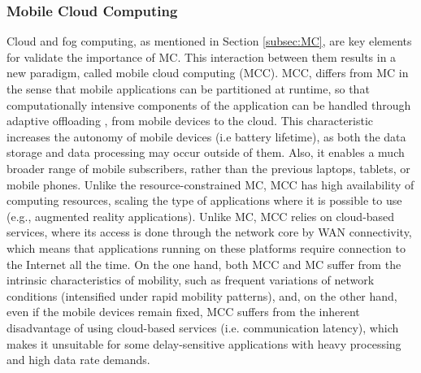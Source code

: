 \subsubsection{Mobile Cloud Computing}
\noindent Cloud and fog computing, as mentioned in Section \ref{subsec:MC}, are key elements for validate the importance of MC. This interaction between them results in a new paradigm, called mobile cloud computing (MCC). MCC, differs from MC in the sense that mobile applications can be partitioned at runtime, so that computationally intensive components of the application can be handled through adaptive offloading \cite{shiraz2013review}, from mobile devices to the cloud. This characteristic increases the autonomy of mobile devices (i.e battery lifetime), as both the data storage and data processing may occur outside of them. Also, it enables a much broader range of mobile subscribers, rather than the previous laptops, tablets, or mobile phones. Unlike the resource-constrained MC, MCC has high availability of computing resources, scaling the type of applications where it is possible to use (e.g., augmented reality applications). Unlike MC, MCC relies on cloud-based services, where its access is done through the network core by WAN connectivity, which means that applications running on these platforms require connection to the Internet all the time. On the one hand, both MCC and MC suffer from the intrinsic characteristics of mobility, such as frequent variations of network conditions (intensified under rapid mobility patterns), and, on the other hand, even if the mobile devices remain fixed, MCC suffers from the inherent disadvantage of using cloud-based services (i.e. communication latency), which makes it unsuitable for some delay-sensitive applications with heavy processing and high data rate demands.

